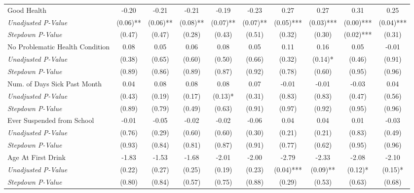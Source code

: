 \begin{tabular}{l c c c c c c c c c}
Good Health & -0.20 & -0.21 & -0.21 & -0.19 & -0.23 & 0.27 & 0.27 & 0.31 & 0.25 \\
\quad \textit{Unadjusted P-Value} & (0.06)** & (0.06)** & (0.08)** & (0.07)** & (0.07)** & (0.05)*** & (0.03)*** & (0.00)*** & (0.04)*** \\
\quad \textit{Stepdown P-Value} & (0.47) & (0.47) & (0.28) & (0.43) & (0.51) & (0.32) & (0.30) & (0.02)*** & (0.31) \\
No Problematic Health Condition & 0.08 & 0.05 & 0.06 & 0.08 & 0.05 & 0.11 & 0.16 & 0.05 & -0.01 \\
\quad \textit{Unadjusted P-Value} & (0.38) & (0.65) & (0.60) & (0.50) & (0.66) & (0.32) & (0.14)* & (0.46) & (0.91) \\
\quad \textit{Stepdown P-Value} & (0.89) & (0.86) & (0.89) & (0.87) & (0.92) & (0.78) & (0.60) & (0.95) & (0.96) \\
Num. of Days Sick Past Month & 0.04 & 0.08 & 0.08 & 0.08 & 0.07 & -0.01 & -0.01 & -0.03 & 0.04 \\
\quad \textit{Unadjusted P-Value} & (0.43) & (0.19) & (0.17) & (0.13)* & (0.31) & (0.83) & (0.83) & (0.47) & (0.56) \\
\quad \textit{Stepdown P-Value} & (0.89) & (0.79) & (0.49) & (0.63) & (0.91) & (0.97) & (0.92) & (0.95) & (0.96) \\
Ever Suspended from School & -0.01 & -0.05 & -0.02 & -0.02 & -0.06 & 0.04 & 0.04 & 0.01 & -0.03 \\
\quad \textit{Unadjusted P-Value} & (0.76) & (0.29) & (0.60) & (0.60) & (0.30) & (0.21) & (0.21) & (0.83) & (0.49) \\
\quad \textit{Stepdown P-Value} & (0.93) & (0.84) & (0.81) & (0.87) & (0.91) & (0.77) & (0.62) & (0.95) & (0.96) \\
Age At First Drink & -1.83 & -1.53 & -1.68 & -2.01 & -2.00 & -2.79 & -2.33 & -2.08 & -2.10 \\
\quad \textit{Unadjusted P-Value} & (0.22) & (0.27) & (0.25) & (0.19) & (0.23) & (0.04)*** & (0.09)** & (0.12)* & (0.15)* \\
\quad \textit{Stepdown P-Value} & (0.80) & (0.84) & (0.57) & (0.75) & (0.88) & (0.29) & (0.53) & (0.63) & (0.68) \\
\bottomrule
\end{tabular}
